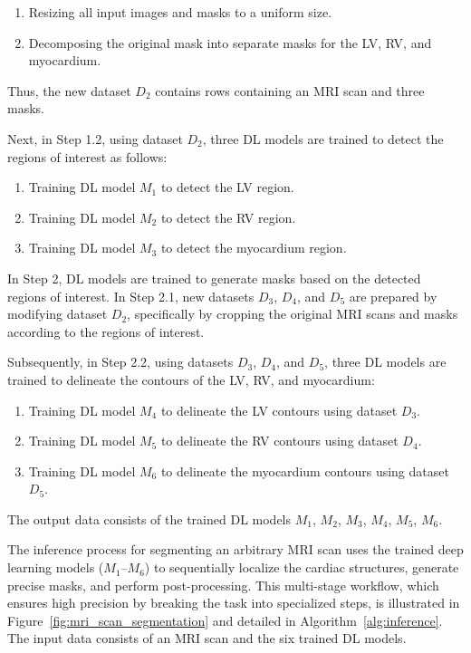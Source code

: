 \documentclass[fleqn,10pt]{wlscirep}
\begin{document}
\begin{enumerate}[label=Step 1.1.\arabic*:, leftmargin=6.5em]
    \item Resizing all input images and masks to a uniform size.
    \item Decomposing the original mask into separate masks for the LV, RV, and myocardium.
\end{enumerate}

Thus, the new dataset \({D_2}\) contains rows containing an MRI scan and three masks.

Next, in Step 1.2, using dataset \({D_2}\), three DL models are trained to detect the regions of interest as follows:

\begin{enumerate}[label=Step 1.2.\arabic*:, leftmargin=6.5em]
    \item Training DL model \({M_1}\) to detect the LV region.
    \item Training DL model \({M_2}\) to detect the RV region.
    \item Training DL model \({M_3}\) to detect the myocardium region.
\end{enumerate}

In Step 2, DL models are trained to generate masks based on the detected regions of interest. In Step 2.1, new datasets \({D_3}\), \({D_4}\), and \({D_5}\) are prepared by modifying dataset \({D_2}\), specifically by cropping the original MRI scans and masks according to the regions of interest.

Subsequently, in Step 2.2, using datasets \({D_3}\), \({D_4}\), and \({D_5}\), three DL models are trained to delineate the contours of the LV, RV, and myocardium:

\begin{enumerate}[label=Step 2.2.\arabic*:, leftmargin=6.5em]
    \item Training DL model \({M_4}\) to delineate the LV contours using dataset \({D_3}\).
    \item Training DL model \({M_5}\) to delineate the RV contours using dataset \({D_4}\).
    \item Training DL model \({M_6}\) to delineate the myocardium contours using dataset \({D_5}\).
\end{enumerate}

The output data consists of the trained DL models \({M_1}\), \({M_2}\), \({M_3}\), \({M_4}\), \({M_5}\), \({M_6}\).

The inference process for segmenting an arbitrary MRI scan uses the trained deep learning models (\(M_1\)--\(M_6\)) to sequentially localize the cardiac structures, generate precise masks, and perform post-processing. This multi-stage workflow, which ensures high precision by breaking the task into specialized steps, is illustrated in Figure~\ref{fig:mri_scan_segmentation} and detailed in Algorithm~\ref{alg:inference}. The input data consists of an MRI scan and the six trained DL models.
\end{document}
